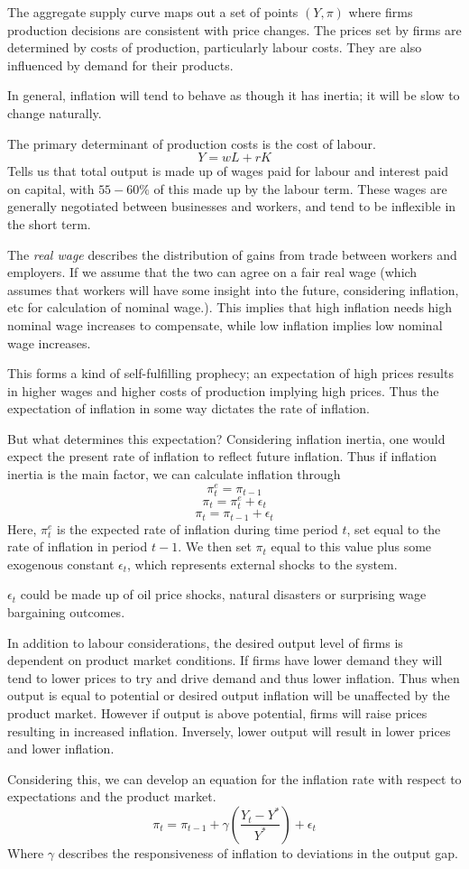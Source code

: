 \documentclass[12pt]{report}
\begin{document}
\begin{flushleft}
The aggregate supply curve maps out a set of points \((Y, \pi)\) where firms
production decisions are consistent with price changes. The prices set by firms
are determined by costs of production, particularly labour costs. They are also
influenced by demand for their products. \par
In general, inflation will tend to behave as though it has inertia; it will
be slow to change naturally. \par
The primary determinant of production costs is the cost of labour.
\[Y = wL + rK\]
Tells us that total output is made up of wages paid for labour and interest
paid on capital, with \(55-60\%\) of this made up by the labour term. These
wages are generally negotiated between businesses and workers, and tend to
be inflexible in the short term. \par
The \textit{real wage} describes the distribution of gains from trade between
workers and employers. If we assume that the two can agree on a fair real wage
(which assumes that workers will have some insight into the future, considering
inflation, etc for calculation of nominal wage.). This implies that high
inflation needs high nominal wage increases to compensate, while low inflation
implies low nominal wage increases. \par
This forms a kind of self-fulfilling
prophecy; an expectation of high prices results in higher wages and higher
costs of production implying high prices. Thus the expectation of inflation in
some way dictates the rate of inflation. \par
But what determines this expectation? Considering inflation inertia, one would
expect the present rate of inflation to reflect future inflation. Thus if
inflation inertia is the main factor, we can calculate inflation through
\[\pi^e_t = \pi_{t - 1}\]
\[\pi_t = \pi^e_t + \epsilon_t\]
\[\pi_t = \pi_{t - 1} + \epsilon_t\]
Here, \(\pi^e_t\) is the expected rate of inflation during time period \(t\),
set equal to the rate of inflation in period \(t - 1\). We then set \(\pi_t\)
equal to this value plus some exogenous constant \(\epsilon_t\), which
represents external shocks to the system. \par
\(\epsilon_t\) could be made up of oil price shocks, natural disasters or
surprising wage bargaining outcomes. \par
In addition to labour considerations, the desired output level of firms is
dependent on product market conditions. If firms have lower demand they will
tend to lower prices to try and drive demand and thus lower inflation. Thus
when output is equal to potential or desired output inflation will be
unaffected by the product market. However if output is above potential, firms
will raise prices resulting in increased inflation. Inversely, lower output 
will result in lower prices and lower inflation. \par
Considering this, we can develop an equation for the inflation rate with
respect to expectations and the product market.
\[\pi_t = \pi_{t - 1} + \gamma\left(\frac{Y_t - Y^*}{Y^*}\right) + \epsilon_t\]
Where \(\gamma\) describes the responsiveness of inflation to deviations in the
output gap.


\end{flushleft}
\end{document}
